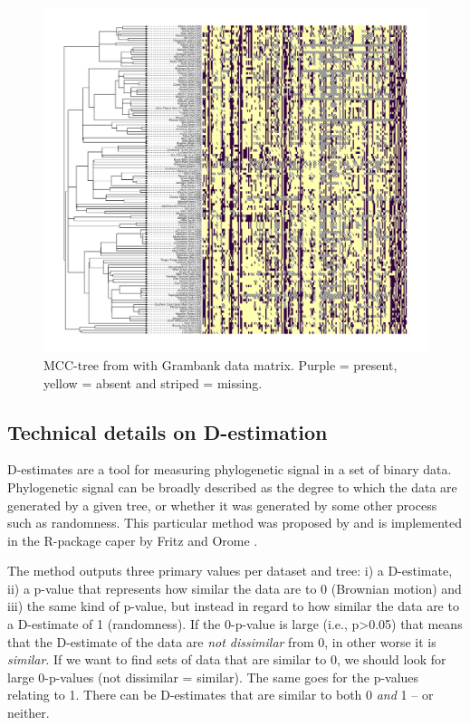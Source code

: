 \documentclass[12pt,letterpaper]{article}
\begin{document}
\begin{figure}[!ht]
\centering
\includegraphics[width=18cm]{illustrations/plots_from_R/coverage_plots/tree_heatmap_gray_mcct.png}
\caption{MCC-tree from \citet{grayetal_2009} with Grambank data matrix. Purple = present, yellow = absent and striped = missing.}
\label{fig:tree_heatmap}
\end{figure}


\FloatBarrier
\newpage
\subsection{Technical details on D-estimation}
\label{supp:d_estimate}
D-estimates are a tool for measuring phylogenetic signal in a set of binary data. Phylogenetic signal can be broadly described as the degree to which the data are generated by a given tree, or whether it was generated by some other process such as randomness. This particular method was proposed by \cite{fritz2010selectivity} and is implemented in the R-package caper by Fritz and Orome \citep{orme2013caper}. 

The method outputs three primary values per dataset and tree: i) a D-estimate, ii) a p-value that represents how similar the data are to 0 (Brownian motion) and iii) the same kind of p-value, but instead in regard to how similar the data are to a D-estimate of 1 (randomness). If the 0-p-value is large (i.e., p>0.05) that means that the D-estimate of the data are \emph{not dissimilar} from 0, in other worse it is \emph{similar}. If we want to find sets of data that are similar to 0, we should look for large 0-p-values (not dissimilar = similar). The same goes for the p-values relating to 1. There can be D-estimates that are similar to both 0 \emph{and} 1 -- or neither.
\end{document}
